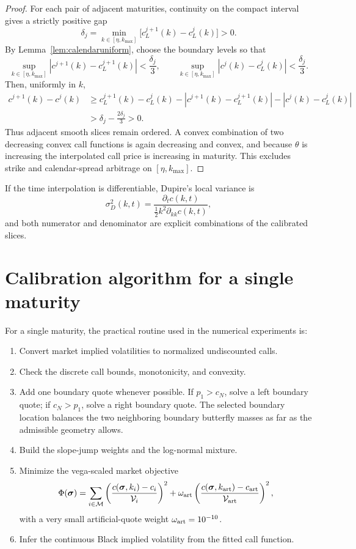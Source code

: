 \documentclass[11pt]{article}
\newcommand{\Vega}{\mathcal{V}}
\begin{document}
\begin{proof}
For each pair of adjacent maturities, continuity on the compact interval gives a strictly positive gap
\[
\delta_j=
\min_{k\in[\eta,k_{\max}]}
\bigl[c_L^{j+1}(k)-c_L^j(k)\bigr]>0.
\]
By Lemma~\ref{lem:calendaruniform}, choose the boundary levels so that
\[
\sup_{k\in[\eta,k_{\max}]}|c^{j+1}(k)-c_L^{j+1}(k)|<\frac{\delta_j}{3},
\qquad
\sup_{k\in[\eta,k_{\max}]}|c^j(k)-c_L^j(k)|<\frac{\delta_j}{3}.
\]
Then, uniformly in $k$,
\begin{align*}
c^{j+1}(k)-c^j(k)
&\ge c_L^{j+1}(k)-c_L^j(k)
-|c^{j+1}(k)-c_L^{j+1}(k)|
-|c^j(k)-c_L^j(k)|\\
&>\delta_j-\frac{2\delta_j}{3}>0.
\end{align*}
Thus adjacent smooth slices remain ordered. A convex combination of two decreasing convex call functions is again decreasing and convex, and because $\theta$ is increasing the interpolated call price is increasing in maturity. This excludes strike and calendar-spread arbitrage on $[\eta,k_{\max}]$.
\end{proof}

If the time interpolation is differentiable, Dupire's local variance is
\begin{equation}
\sigma_D^2(k,t)
=\frac{\partial_t c(k,t)}{\frac12 k^2\partial_{kk}c(k,t)},
\end{equation}
and both numerator and denominator are explicit combinations of the calibrated slices.

\section{Calibration algorithm for a single maturity}\label{sec:calibration}
For a single maturity, the practical routine used in the numerical experiments is:
\begin{enumerate}[label=\arabic*)]
\item Convert market implied volatilities to normalized undiscounted calls.
\item Check the discrete call bounds, monotonicity, and convexity.
\item Add one boundary quote whenever possible. If $p_1>c_N$, solve a left boundary quote; if $c_N>p_1$, solve a right boundary quote. The selected boundary location balances the two neighboring boundary butterfly masses as far as the admissible geometry allows.
\item Build the slope-jump weights and the log-normal mixture.
\item Minimize the vega-scaled market objective
\begin{equation}
\Phi(\bm\sigma)=
\sum_{i\in\mathcal M}
\left(\frac{c(\bm\sigma,k_i)-c_i}{\Vega_i}\right)^2
+
\omega_{\rm art}
\left(\frac{c(\bm\sigma,k_{\rm art})-c_{\rm art}}{\Vega_{\rm art}}\right)^2,
\label{eq:objective}
\end{equation}
with a very small artificial-quote weight $\omega_{\rm art}=10^{-10}$.
\item Infer the continuous Black implied volatility from the fitted call function.
\end{enumerate}
\end{document}
